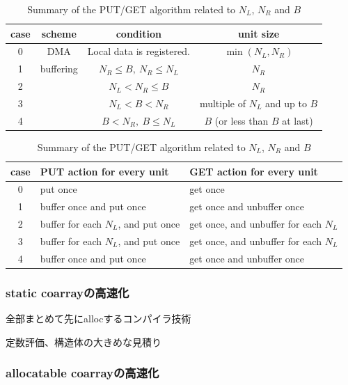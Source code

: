 \begin{table}[tbh]
 \caption{Summary of the PUT/GET algorithm related to $N_L$, $N_R$ and $B$}
 \label{tab:putget}
 \begin{flushleft}
  \begin{tabular}{|c||c|c|c|}
\hline
case & scheme 
& condition 
& unit size
\\
\hline
\hline
0 & DMA   
& Local data is registered.
& $\min(N_L, N_R)$   
\\
\hline
1 & buffering 
& $N_R \leq B,~ N_R \leq N_L$
& $N_R$
\\
\cline{1-1} \cline{3-4}
2 &
& $N_L < N_R \leq B$
& $N_R$
\\
\cline{1-1} \cline{3-4}
3 &
& $N_L < B < N_R$
& multiple of $N_L$ and up to $B$
\\
\cline{1-1} \cline{3-4}
4 &
& $B < N_R,~ B \leq N_L$
& $B$ (or less than $B$ at last)
\\
\hline
  \end{tabular}
 \end{flushleft}
 \begin{flushleft}
  \begin{tabular}{|c||l|l|}
\hline
case 
& PUT action for every unit
& GET action for every unit
\\
\hline
\hline
0 
& put once
& get once
\\
\hline
1 
& buffer once and put once
& get once and unbuffer once
\\
\hline
2 
& buffer for each $N_L$, and put once
& get once, and unbuffer for each $N_L$
\\
\hline
3 
& buffer for each $N_L$, and put once
& get once, and unbuffer for each $N_L$
\\
\hline
4 
& buffer once and put once
& get once and unbuffer once
\\
\hline
  \end{tabular}
 \end{flushleft}
\end{table}




\subsubsection{static coarrayの高速化}

全部まとめて先にallocするコンパイラ技術

定数評価、構造体の大きめな見積り

\subsubsection{allocatable coarrayの高速化}

